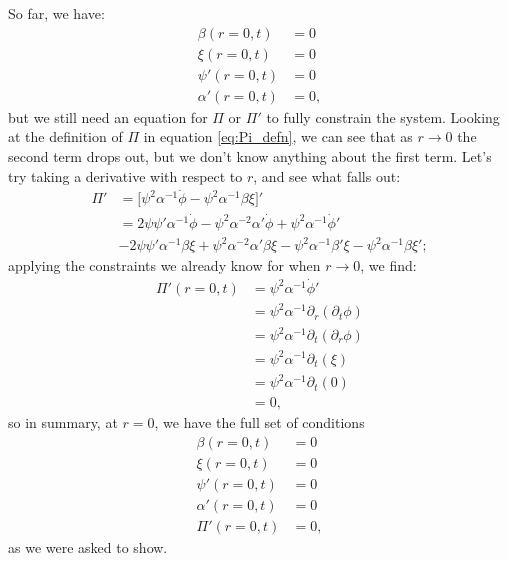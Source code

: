 \documentclass[12pt]{article}
\numberwithin{equation}{section}
\begin{document}
So far, we have:
\begin{equation*}
\begin{aligned}
\beta  (r=0, t) &= 0 \\
\xi    (r=0, t) &= 0 \\
\psi'  (r=0, t) &= 0 \\
\alpha'(r=0, t) &= 0,
\end{aligned}
\end{equation*}
but we still need an equation for $\Pi$ or $\Pi'$ to fully constrain the system.  Looking at the definition of $\Pi$ in equation \ref{eq:Pi_defn}, we can see that as $r \to 0$ the second term drops out, but we don't know anything about the first term.  Let's try taking a derivative with respect to $r$, and see what falls out:
\begin{equation*}
\begin{aligned}
\Pi' &= \Big[ \psi^2 \alpha^{-1} \dot{\phi} - \psi^2 \alpha^{-1} \beta \xi \Big]' \\
&= 2 \psi \psi' \alpha^{-1} \dot{\phi} - \psi^2 \alpha^{-2} \alpha' \dot{\phi} + \psi^2 \alpha^{-1} \dot{\phi}' \\
&- 2 \psi \psi' \alpha^{-1} \beta \xi + \psi^2 \alpha^{-2} \alpha' \beta \xi - \psi^2 \alpha^{-1} \beta' \xi - \psi^2 \alpha^{-1} \beta \xi';
\end{aligned}
\end{equation*}
applying the constraints we already know for when $r \to 0$, we find:
\begin{equation*}
\begin{aligned}
\Pi'(r=0, t) &= \psi^2 \alpha^{-1} \dot{\phi}' \\
&= \psi^2 \alpha^{-1} \partial_r (\partial_t \phi) \\
&= \psi^2 \alpha^{-1} \partial_t (\partial_r \phi) \\
&= \psi^2 \alpha^{-1} \partial_t (\xi) \\
&= \psi^2 \alpha^{-1} \partial_t (0) \\
&= 0,
\end{aligned}
\end{equation*}
so in summary, at $r = 0$, we have the full set of conditions
\begin{equation}
\begin{aligned}
\beta  (r=0, t) &= 0 \\
\xi    (r=0, t) &= 0 \\
\psi'  (r=0, t) &= 0 \\
\alpha'(r=0, t) &= 0 \\
\Pi'   (r=0, t) &= 0,
\end{aligned}
\end{equation}
as we were asked to show.
\end{document}
